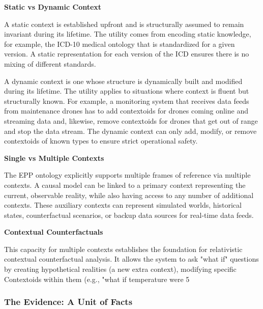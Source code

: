 \textbf{Static vs Dynamic Context}

A static context is established upfront and is structurally assumed to remain invariant during its lifetime. The utility comes from encoding static knowledge, for example, the ICD-10 medical ontology that is standardized for a given version. A static representation for each version of the ICD ensures there is no mixing of different standards. 

A dynamic context is one whose structure is dynamically built and modified during its lifetime. The utility applies to situations where context is fluent but structurally known. For example, a monitoring system that receives data feeds from maintenance drones has to add contextoids for drones coming online and streaming data and, likewise, remove contextoids for drones that get out of range and stop the data stream. The dynamic context can only add, modify, or remove contextoids of known types to ensure strict operational safety. 

\newpage

\textbf{Single vs Multiple Contexts}


The EPP ontology explicitly supports  multiple frames of reference via multiple contexts. A causal model can be linked to a primary context  representing the current, observable reality, while also having access to any number of additional contexts. These auxiliary contexts can represent simulated worlds, historical states, counterfactual scenarios, or backup data sources for real-time data feeds.

\textbf{Contextual Counterfactuals}

This capacity for multiple contexts establishes the foundation for relativistic contextual counterfactual analysis. It allows the system to ask "what if" questions by creating hypothetical realities (a new extra context), modifying specific Contextoids within them (e.g., "what if temperature were 5%

\subsubsection{The Evidence: A Unit of Facts}
\label{sec:ontology_evidence}


